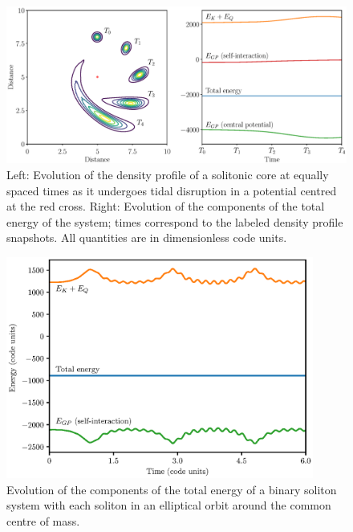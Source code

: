 \documentclass[a4paper,11pt]{article}
\begin{document}
\begin{figure}
  \includegraphics[width=1.1\textwidth,trim=2.5cm 0 0 1cm,clip]{combined_energy_and_density1}
  \caption{Left: Evolution of the density profile of a solitonic core at equally spaced times as it undergoes tidal disruption in a potential centred at the red cross. Right: Evolution of the components of the total energy of the system; times  correspond to the labeled density profile snapshots. All quantities are in dimensionless code units.}
  \label{fig:combined_1}
\end{figure}

\begin{figure}
  \includegraphics[width=0.9\textwidth,trim=0 0 2cm 2cm,clip]{egy_m=22.eps}
  \caption{Evolution of the components of the total energy of a binary soliton system with each soliton in an elliptical orbit around the common centre of mass.}
  \label{fig:binary}
\end{figure}
\end{document}
